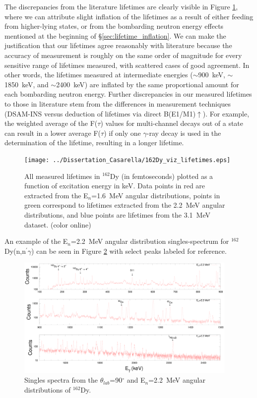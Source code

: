 The discrepancies from the literature lifetimes are clearly visible in Figure \ref{fig:162Dy_viz_lifetimes}, where we can attribute slight inflation of the lifetimes as a result of either feeding from higher-lying states, or from the bombarding neutron energy effects mentioned at the beginning of \S \ref{sec:lifetime_inflation}. We can make the justification that our lifetimes agree reasonably with literature because the accuracy of measurement is roughly on the same order of magnitude for every sensitive range of lifetimes measured, with scattered cases of good agreement. In other words, the lifetimes measured at intermediate energies ($\sim$900~keV, $\sim$1850~keV, and $\sim$2400~keV) are inflated by the same proportional amount for each bombarding neutron energy. Further discrepancies in our measured lifetimes to those in literature stem from the differences in measurement techniques (DSAM-INS versus deduction of lifetimes via direct B(E1/M1)$\uparrow$). For example, the weighted average of the F($\tau$) values for multi-channel decays out of a state can result in a lower average F($\tau$) if only one $\gamma$-ray decay is used in the determination of the lifetime, resulting in a longer lifetime. 

\begin{figure}[h!]
\begin{center}
\texttt{[image: ../Dissertation\_Casarella/162Dy\_viz\_lifetimes.eps]}
\caption{All measured lifetimes in $^{162}$Dy (in femtoseconds) plotted as a function of excitation energy in keV. Data points in red are extracted from the E$_n$=1.6~MeV angular distributions, points in green correspond to lifetimes extracted from the 2.2~MeV angular distributions, and blue points are lifetimes from the 3.1~MeV dataset. (color online) \label{fig:162Dy_viz_lifetimes}}
\end{center}
\end{figure}

An example of the E$_n$=2.2~MeV angular distribution singles-spectrum for $^{162}$Dy(n,n$^\prime\gamma$) can be seen in Figure \ref{fig:162Dy_220_spectrum} with select peaks labeled for reference.

\begin{figure}[h!]
\begin{center}
\includegraphics[width=0.95\textwidth]{sample_spec_stacked_220.eps}
\caption{Singles spectra from the $\theta_{lab}$=90$^\circ$ and E$_n$=2.2~MeV angular distributions of $^{162}$Dy. \label{fig:162Dy_220_spectrum}}
\end{center}
\end{figure}


